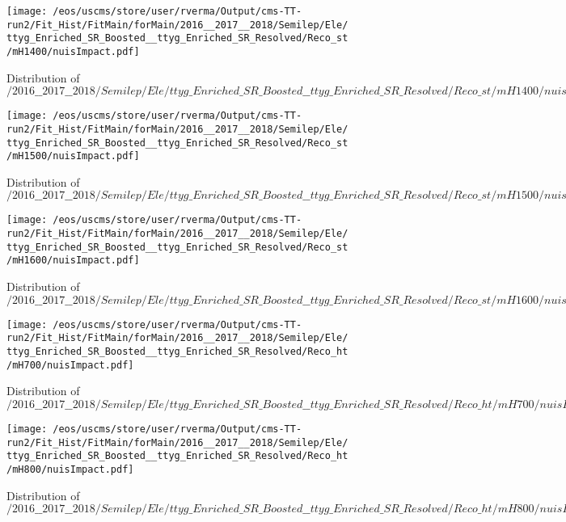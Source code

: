 \begin{figure}
\centering
\texttt{[image: /eos/uscms/store/user/rverma/Output/cms-TT-run2/Fit\_Hist/FitMain/forMain/2016\_\_2017\_\_2018/Semilep/Ele/ttyg\_Enriched\_SR\_Boosted\_\_ttyg\_Enriched\_SR\_Resolved/Reco\_st/mH1400/nuisImpact.pdf]}
\caption{Distribution of $/2016\_\_2017\_\_2018/Semilep/Ele/ttyg\_Enriched\_SR\_Boosted\_\_ttyg\_Enriched\_SR\_Resolved/Reco\_st/mH1400/nuisImpact.pdf$}
\end{figure}

\begin{figure}
\centering
\texttt{[image: /eos/uscms/store/user/rverma/Output/cms-TT-run2/Fit\_Hist/FitMain/forMain/2016\_\_2017\_\_2018/Semilep/Ele/ttyg\_Enriched\_SR\_Boosted\_\_ttyg\_Enriched\_SR\_Resolved/Reco\_st/mH1500/nuisImpact.pdf]}
\caption{Distribution of $/2016\_\_2017\_\_2018/Semilep/Ele/ttyg\_Enriched\_SR\_Boosted\_\_ttyg\_Enriched\_SR\_Resolved/Reco\_st/mH1500/nuisImpact.pdf$}
\end{figure}

\begin{figure}
\centering
\texttt{[image: /eos/uscms/store/user/rverma/Output/cms-TT-run2/Fit\_Hist/FitMain/forMain/2016\_\_2017\_\_2018/Semilep/Ele/ttyg\_Enriched\_SR\_Boosted\_\_ttyg\_Enriched\_SR\_Resolved/Reco\_st/mH1600/nuisImpact.pdf]}
\caption{Distribution of $/2016\_\_2017\_\_2018/Semilep/Ele/ttyg\_Enriched\_SR\_Boosted\_\_ttyg\_Enriched\_SR\_Resolved/Reco\_st/mH1600/nuisImpact.pdf$}
\end{figure}

\begin{figure}
\centering
\texttt{[image: /eos/uscms/store/user/rverma/Output/cms-TT-run2/Fit\_Hist/FitMain/forMain/2016\_\_2017\_\_2018/Semilep/Ele/ttyg\_Enriched\_SR\_Boosted\_\_ttyg\_Enriched\_SR\_Resolved/Reco\_ht/mH700/nuisImpact.pdf]}
\caption{Distribution of $/2016\_\_2017\_\_2018/Semilep/Ele/ttyg\_Enriched\_SR\_Boosted\_\_ttyg\_Enriched\_SR\_Resolved/Reco\_ht/mH700/nuisImpact.pdf$}
\end{figure}

\begin{figure}
\centering
\texttt{[image: /eos/uscms/store/user/rverma/Output/cms-TT-run2/Fit\_Hist/FitMain/forMain/2016\_\_2017\_\_2018/Semilep/Ele/ttyg\_Enriched\_SR\_Boosted\_\_ttyg\_Enriched\_SR\_Resolved/Reco\_ht/mH800/nuisImpact.pdf]}
\caption{Distribution of $/2016\_\_2017\_\_2018/Semilep/Ele/ttyg\_Enriched\_SR\_Boosted\_\_ttyg\_Enriched\_SR\_Resolved/Reco\_ht/mH800/nuisImpact.pdf$}
\end{figure}

